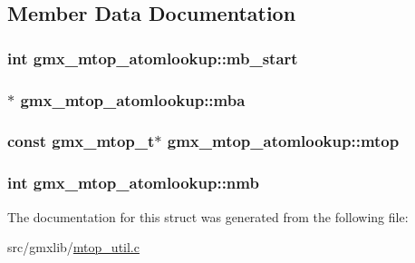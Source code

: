 \subsection{\-Member \-Data \-Documentation}
\hypertarget{structgmx__mtop__atomlookup_a93388f33d14b29434d2a8cdd8904bda7}{
\subsubsection[{mb\-\_\-start}]{\setlength{\rightskip}{0pt plus 5cm}int {\bf gmx\-\_\-mtop\-\_\-atomlookup\-::mb\-\_\-start}}}\label{structgmx__mtop__atomlookup_a93388f33d14b29434d2a8cdd8904bda7}
\hypertarget{structgmx__mtop__atomlookup_a51f156cccac868eff5d8cd35d7548e7b}{
\subsubsection[{mba}]{$\ast$ {\bf gmx\-\_\-mtop\-\_\-atomlookup\-::mba}}}\label{structgmx__mtop__atomlookup_a51f156cccac868eff5d8cd35d7548e7b}
\hypertarget{structgmx__mtop__atomlookup_a5ca62ed925e1f7425edc45099be07be9}{
\subsubsection[{mtop}]{\setlength{\rightskip}{0pt plus 5cm}const {\bf gmx\-\_\-mtop\-\_\-t}$\ast$ {\bf gmx\-\_\-mtop\-\_\-atomlookup\-::mtop}}}\label{structgmx__mtop__atomlookup_a5ca62ed925e1f7425edc45099be07be9}
\hypertarget{structgmx__mtop__atomlookup_a1b041a74baf95667e0fd31dc9820fe26}{
\subsubsection[{nmb}]{\setlength{\rightskip}{0pt plus 5cm}int {\bf gmx\-\_\-mtop\-\_\-atomlookup\-::nmb}}}\label{structgmx__mtop__atomlookup_a1b041a74baf95667e0fd31dc9820fe26}


\-The documentation for this struct was generated from the following file\-:\begin{DoxyCompactItemize}
\item 
src/gmxlib/\hyperlink{mtop__util_8c}{mtop\-\_\-util.\-c}\end{DoxyCompactItemize}

